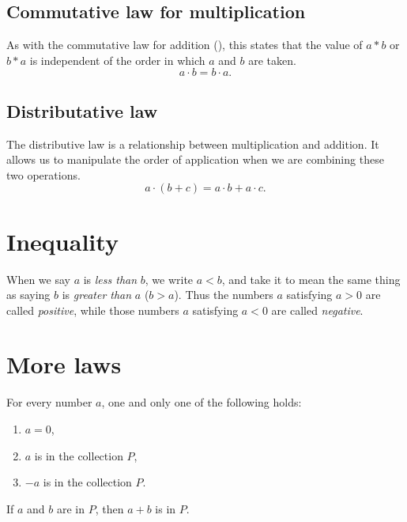 \subsection{Commutative law for multiplication}
As with the commutative law for addition (),
this states that the value of $a * b$ or $b * a$ is independent of the order
in which $a$ and $b$ are taken.\cite[p.~14]{pinter}
\begin{equation}
    a \cdot b = b \cdot a.
\end{equation}

\subsection{Distributative law}
The distributive law is a relationship between multiplication and addition.
It allows us to manipulate the order of application when we are combining these
two operations.
\begin{equation}
    a \cdot (b + c) = a \cdot b + a \cdot c.
\end{equation}

\section{Inequality}
When we say $a$ is 
\emph{less than}
$b$, we write $a < b$,
and take it to mean the same thing as saying $b$ is 
\emph{greater than}
$a$ ($b > a$).\cite[p.~9]{spivak}
Thus the numbers $a$ satisfying $a > 0$ are called \emph{positive}, while
those numbers $a$ satisfying $a < 0$ are called \emph{negative}.

\section{More laws}
\begin{theorem}
For every number $a$, one and only one of the following holds:
\begin{enumerate}
    \item $a = 0$,
    \item $a$ is in the collection $P$,
    \item $-a$ is in the collection $P$.
\end{enumerate}
\cite[p.~9]{spivak}
\end{theorem}

\begin{theorem}
If $a$ and $b$ are in $P$, then $a + b$ is in $P$.
\cite[p.~9]{spivak}
\end{theorem}

